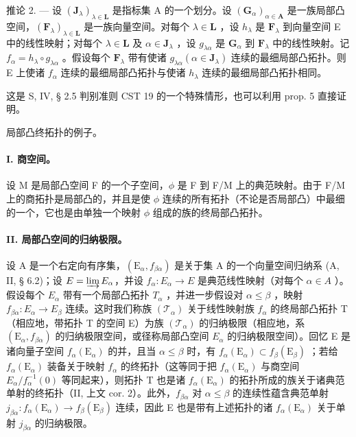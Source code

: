 推论 2. --- 设 \((\mathbf{J}_{\lambda})_{\lambda \in \mathbf{L}}\) 是指标集 A 的一个划分。设 \((\mathbf{G}_{\alpha})_{\alpha \in \mathbf{A}}\) 是一族局部凸空间，\((\mathbf{F}_{\lambda})_{\lambda \in \mathbf{L}}\) 是一族向量空间。对每个 \(\lambda \in \mathbf{L}\) ，设 \(h_{\lambda}\) 是 \(\mathbf{F}_{\lambda}\) 到向量空间 E 中的线性映射；对每个 \(\lambda \in \mathbf{L}\) 及 \(\alpha \in \mathbf{J}_{\lambda}\) ，设 \(g_{\lambda \alpha}\) 是 \(\mathbf{G}_{\alpha}\) 到 \(\mathbf{F}_{\lambda}\) 中的线性映射。记 \(f_{\alpha} = h_{\lambda} \circ g_{\lambda \alpha}\) 。假设每个 \(\mathbf{F}_{\lambda}\) 带有使诸 \(g_{\lambda \alpha} (\alpha \in \mathbf{J}_{\lambda})\) 连续的最细局部凸拓扑。则 E 上使诸 \(f_{\alpha}\) 连续的最细局部凸拓扑与使诸 \(h_{\lambda}\) 连续的最细局部凸拓扑相同。

这是 S, IV, § 2.5 判别准则 CST 19 的一个特殊情形，也可以利用 prop. 5 直接证明。

局部凸终拓扑的例子。

\paragraph{I. 商空间。}

设 M 是局部凸空间 F 的一个子空间，\(\phi\) 是 F 到 F/M 上的典范映射。由于 F/M 上的商拓扑是局部凸的，并且是使 \(\phi\) 连续的所有拓扑（不论是否局部凸）中最细的一个，它也是由单独一个映射 \(\phi\) 组成的族的终局部凸拓扑。

\paragraph{II. 局部凸空间的归纳极限。}

设 A 是一个右定向有序集，\((\mathrm{E}_{\alpha}, f_{\beta\alpha})\) 是关于集 A 的一个向量空间归纳系 (A, II, § 6.2)；设 \(E = \varinjlim E_{\alpha}\)，并设 \(f_{\alpha}: E_{\alpha} \to E\) 是典范线性映射（对每个 \(\alpha \in A\) ）。假设每个 \(E_{\alpha}\) 带有一个局部凸拓扑 \(T_{\alpha}\) ，并进一步假设对 \(\alpha \leqslant \beta\) ，映射 \(f_{\beta\alpha}: E_{\alpha} \to E_{\beta}\) 连续。这时我们称族 \((\mathcal{T}_{\alpha})\) 关于线性映射族 \(f_{\alpha}\) 的终局部凸拓扑 T（相应地，带拓扑 T 的空间 E）为族 \((\mathcal{T}_{\alpha})\) 的归纳极限（相应地，系 \((\mathrm{E}_{\alpha}, f_{\beta\alpha})\) 的归纳极限空间，或径称局部凸空间 \(E_{\alpha}\) 的归纳极限空间）。回忆 E 是诸向量子空间 \(f_{\alpha}(\mathrm{E}_{\alpha})\) 的并，且当 \(\alpha \leqslant \beta\) 时，有 \(f_{\alpha}(\mathrm{E}_{\alpha}) \subset f_{\beta}(\mathrm{E}_{\beta})\) ；若给 \(f_{\alpha}(\mathrm{E}_{\alpha})\) 装备关于映射 \(f_{\alpha}\) 的终拓扑（这等同于把 \(f_{\alpha}(\mathrm{E}_{\alpha})\) 与商空间 \(E_{\alpha}/f_{\alpha}^{-1}(0)\) 等同起来），则拓扑 T 也是诸 \(f_{\alpha}(\mathrm{E}_{\alpha})\) 的拓扑所成的族关于诸典范单射的终拓扑（II, 上文 cor. 2）。此外，\(f_{\beta\alpha}\) 对 \(\alpha \leqslant \beta\) 的连续性蕴含典范单射 \(j_{\beta\alpha}: f_{\alpha}(\mathrm{E}_{\alpha}) \to f_{\beta}(\mathrm{E}_{\beta})\) 连续，因此 E 也是带有上述拓扑的诸 \(f_{\alpha}(\mathrm{E}_{\alpha})\) 关于单射 \(j_{\beta\alpha}\) 的归纳极限。

